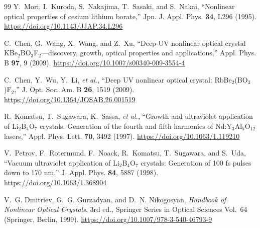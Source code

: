 \documentclass[aps,pra,preprint,amsmath,amssymb,nofootinbib,superscriptaddress]{revtex4-2}
\begin{document}
\begin{thebibliography}{99}
 Y.~Mori, I.~Kuroda, S.~Nakajima, T.~Sasaki, and S.~Nakai, ``Nonlinear optical properties of cesium lithium borate,'' Jpn. J. Appl. Phys. \textbf{34}, L296 (1995). \url{https://doi.org/10.1143/JJAP.34.L296}

 C.~Chen, G.~Wang, X.~Wang, and Z.~Xu, ``Deep-UV nonlinear optical crystal KBe$_2$BO$_3$F$_2$---discovery, growth, optical properties and applications,'' Appl. Phys. B \textbf{97}, 9 (2009). \url{https://doi.org/10.1007/s00340-009-3554-4}

 C.~Chen, Y.~Wu, Y.~Li, \emph{et al.}, ``Deep UV nonlinear optical crystal: RbBe$_2$(BO$_3$)F$_2$,'' J. Opt. Soc. Am. B \textbf{26}, 1519 (2009). \url{https://doi.org/10.1364/JOSAB.26.001519}

 R.~Komatsu, T.~Sugawara, K.~Sassa, \emph{et al.}, ``Growth and ultraviolet application of Li$_2$B$_4$O$_7$ crystals: Generation of the fourth and fifth harmonics of Nd:Y$_3$Al$_5$O$_{12}$ lasers,'' Appl. Phys. Lett. \textbf{70}, 3492 (1997). \url{https://doi.org/10.1063/1.119210}

 V.~Petrov, F.~Rotermund, F.~Noack, R.~Komatsu, T.~Sugawara, and S.~Uda, ``Vacuum ultraviolet application of Li$_2$B$_4$O$_7$ crystals: Generation of 100 fs pulses down to 170 nm,'' J. Appl. Phys. \textbf{84}, 5887 (1998). \url{https://doi.org/10.1063/1.368904}

 V.~G. Dmitriev, G.~G. Gurzadyan, and D.~N. Nikogosyan, \emph{Handbook of Nonlinear Optical Crystals}, 3rd ed., Springer Series in Optical Sciences Vol.~64 (Springer, Berlin, 1999). \url{https://doi.org/10.1007/978-3-540-46793-9}

\end{thebibliography}
\end{document}
